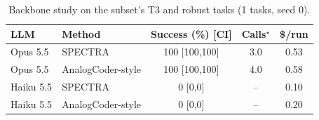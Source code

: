 \begin{table}[t]
\centering
\caption{Backbone study on the subset's T3 and robust tasks (1 tasks, seed 0).}
\label{tab:scaling}
\scriptsize
\setlength{\tabcolsep}{3pt}
\begin{tabular}{@{}llccc@{}}
\toprule
LLM & Method & Success (\%) [CI] & Calls$^\star$ & \$/run \\
\midrule
Opus 5.5 & SPECTRA & 100 [100,100] & 3.0 & 0.53 \\
Opus 5.5 & AnalogCoder-style & 100 [100,100] & 4.0 & 0.58 \\
Haiku 5.5 & SPECTRA & 0 [0,0] & -- & 0.10 \\
Haiku 5.5 & AnalogCoder-style & 0 [0,0] & -- & 0.20 \\
\bottomrule
\end{tabular}
\end{table}
